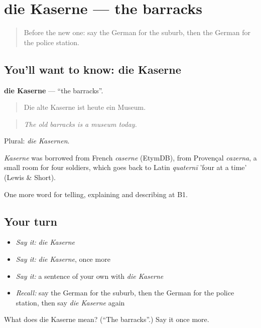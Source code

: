 \section[die Kaserne]{die Kaserne — the barracks}

\label{lesson:GE-C439-kaserne}



\begin{quote}
Before the new one: say the German for the suburb, then the German for the police station.
\end{quote}

\subsection*{You'll want to know: die Kaserne}
\textbf{die Kaserne} — \textquotedblleft{}the barracks\textquotedblright{}.

\begin{quote}
Die alte Kaserne ist heute ein Museum.
\end{quote}

\begin{quote}
\emph{The old barracks is a museum today.}
\end{quote}

Plural: \emph{die Kasernen}.

\begin{cousinweb}
\emph{Kaserne} was borrowed from French \emph{caserne} (EtymDB), from Provençal \emph{cazerna}, a small room for four soldiers, which goes back to Latin \emph{quaternī} 'four at a time' (Lewis \& Short).
\end{cousinweb}

\begin{grammarlens}[title={What you've built}]
One more word for telling, explaining and describing at B1.
\end{grammarlens}

\subsection*{Your turn}
\begin{itemize}
\raggedright
  \item \emph{Say it:} \emph{die Kaserne}
  \item \emph{Say it:} \emph{die Kaserne}, once more
  \item \emph{Say it:} a sentence of your own with \emph{die Kaserne}
  \item \emph{Recall:} say the German for the suburb, then the German for the police station, then say \emph{die Kaserne} again
\end{itemize}

\begin{tcolorbox}[breakable,colback=teal!4,colframe=teal!35!black,title={Before you move on}]
What does die Kaserne mean? (\textquotedblleft{}The barracks\textquotedblright{}.) Say it once more.
\end{tcolorbox}
